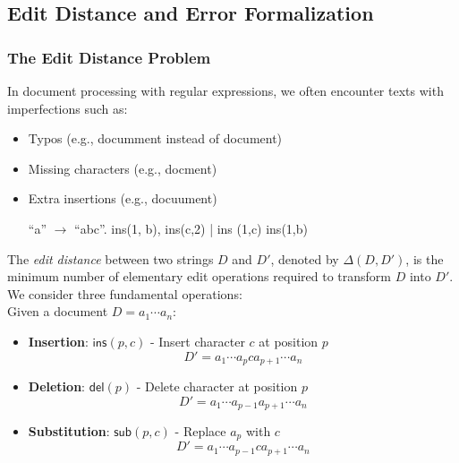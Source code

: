 \documentclass{article}
\begin{document}
%
%

\subsection{Edit Distance and Error Formalization}
\label{sec:edit-distance}

\subsubsection{The Edit Distance Problem}
In document processing with regular expressions, we often encounter texts with imperfections such as:
\begin{itemize}
    \item Typos (e.g., documment instead of document)
    \item Missing characters (e.g., docment)
    \item Extra insertions (e.g., docuument)


    ``a'' $\rightarrow$ ``abc''.  ins(1, b), ins(c,2) | ins (1,c) ins(1,b)


\end{itemize}

The \emph{edit distance} between two strings $D$ and $D'$, denoted by $\Delta(D,D')$, is the minimum number of elementary edit operations required to transform $D$ into $D'$. We consider three fundamental operations:\\

Given a document $D = a_1 \cdots a_n$:
\begin{center}
\begin{itemize}
    \item \textbf{Insertion}: $\mathsf{ins}(p,c)$ - Insert character $c$ at position $p$
    \[ D' = a_1 \cdots a_p c a_{p+1} \cdots a_n \]
    \item \textbf{Deletion}: $\mathsf{del}(p)$ - Delete character at position $p$
    \[ D' = a_1 \cdots a_{p-1} a_{p+1} \cdots a_n \]
    \item \textbf{Substitution}: $\mathsf{sub}(p,c)$ - Replace $a_p$ with $c$
    \[ D' = a_1 \cdots a_{p-1} c a_{p+1} \cdots a_n \]
\end{itemize}
\end{center}
\end{document}
